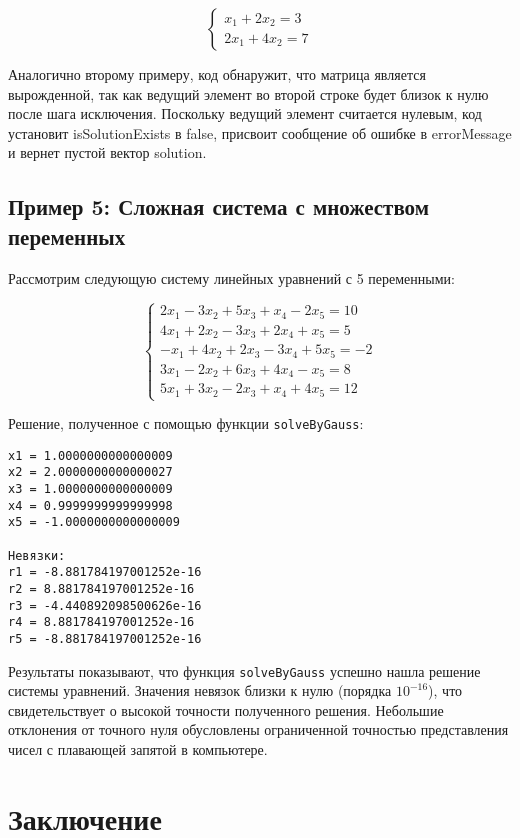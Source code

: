 \[
\begin{cases} 
x_1 + 2x_2 = 3 \\ 
2x_1 + 4x_2 = 7
\end{cases}
\]

Аналогично второму примеру, код обнаружит, что матрица является вырожденной, так как ведущий элемент во второй строке будет близок к нулю после шага исключения. Поскольку ведущий элемент считается нулевым, код установит isSolutionExists в false, присвоит сообщение об ошибке в errorMessage и вернет пустой вектор solution.

\subsection{Пример 5: Сложная система с множеством переменных}

Рассмотрим следующую систему линейных уравнений с 5 переменными:

\[
\begin{cases}
2x_1 - 3x_2 + 5x_3 + x_4 - 2x_5 = 10 \\
4x_1 + 2x_2 - 3x_3 + 2x_4 + x_5 = 5 \\
-x_1 + 4x_2 + 2x_3 - 3x_4 + 5x_5 = -2 \\
3x_1 - 2x_2 + 6x_3 + 4x_4 - x_5 = 8 \\
5x_1 + 3x_2 - 2x_3 + x_4 + 4x_5 = 12
\end{cases}
\]

Решение, полученное с помощью функции \texttt{solveByGauss}:

\begin{verbatim}
x1 = 1.0000000000000009
x2 = 2.0000000000000027
x3 = 1.0000000000000009
x4 = 0.9999999999999998
x5 = -1.0000000000000009

Невязки:
r1 = -8.881784197001252e-16
r2 = 8.881784197001252e-16
r3 = -4.440892098500626e-16
r4 = 8.881784197001252e-16
r5 = -8.881784197001252e-16
\end{verbatim}

Результаты показывают, что функция \texttt{solveByGauss} успешно нашла решение системы уравнений. Значения невязок близки к нулю (порядка $10^{-16}$), что свидетельствует о высокой точности полученного решения. Небольшие отклонения от точного нуля обусловлены ограниченной точностью представления чисел с плавающей запятой в компьютере.

\section{Заключение}

